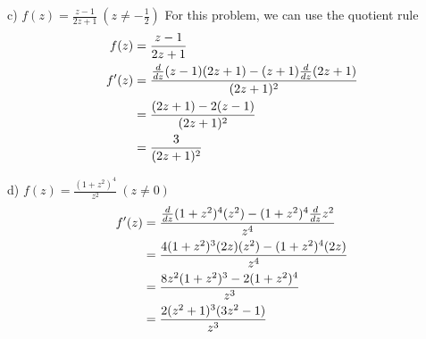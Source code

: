 \documentclass[notitlepage]{article}
\begin{document}
    c) $f(z) = \frac{z-1}{2z+1} \ (z\neq -\frac{1}{2})$
    For this problem, we can use the quotient rule
 \begin{equation}
    \begin{split}
        f(z)    &= \frac{z-1}{2z+1} \\
        f'(z)   &= \frac{\frac{d}{dz}(z-1)(2z+1) - (z+1)\frac{d}{dz}(2z+1)}{(2z+1)^2} \\ 
                &= \frac{(2z+1)-2(z-1)}{(2z+1)^2} \\
                &= \frac{3}{(2z+1)^2}
        \notag
    \end{split}
\end{equation}


    d) $f(z) = \frac{(1+z^2)^4}{z^2} \ (z \neq 0)$
\begin{equation}
    \begin{split}
        \notag
        f'(z)   &= \frac{\frac{d}{dz}(1+z^2)^4(z^2) - (1+z^2)^4\frac{d}{dz}z^2}{z^4} \\
                &= \frac{4(1+z^2)^3(2z)(z^2) - (1+z^2)^4(2z)}{z^4} \\
                &= \frac{8z^2(1+z^2)^3-2(1+z^2)^4}{z^3} \\
                &= \frac{2(z^2+1)^3(3z^2-1)}{z^3}
    \end{split}
\end{equation}
\end{document}
